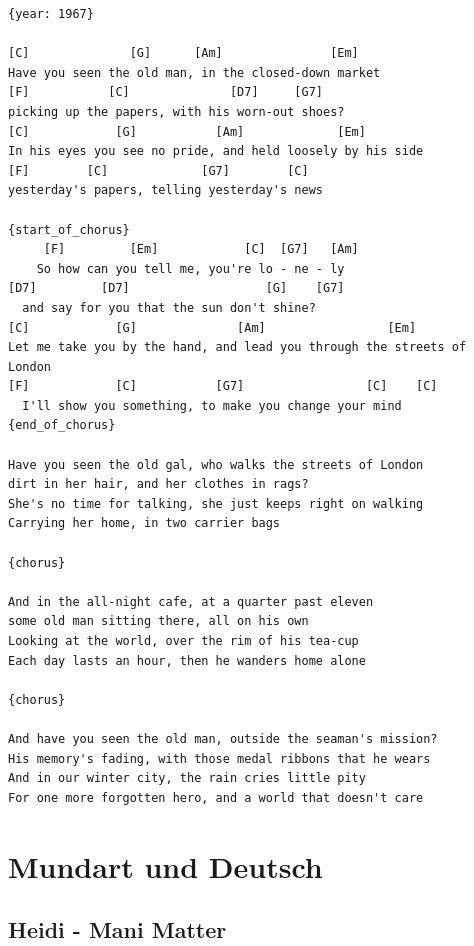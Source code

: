 \documentclass[]{book}
\let\stdsection\section
\renewcommand\section{\clearpage\stdsection}
\begin{document}
\begin{verbatim}
{year: 1967}

[C]              [G]      [Am]               [Em]
Have you seen the old man, in the closed-down market
[F]           [C]              [D7]     [G7]
picking up the papers, with his worn-out shoes?
[C]            [G]           [Am]             [Em]
In his eyes you see no pride, and held loosely by his side
[F]        [C]             [G7]        [C]
yesterday's papers, telling yesterday's news

{start_of_chorus}
     [F]         [Em]            [C]  [G7]   [Am]
    So how can you tell me, you're lo - ne - ly
[D7]         [D7]                   [G]    [G7]
  and say for you that the sun don't shine?
[C]            [G]              [Am]                 [Em]
Let me take you by the hand, and lead you through the streets of London
[F]            [C]           [G7]                 [C]    [C]
  I'll show you something, to make you change your mind
{end_of_chorus}

Have you seen the old gal, who walks the streets of London
dirt in her hair, and her clothes in rags?
She's no time for talking, she just keeps right on walking
Carrying her home, in two carrier bags

{chorus}

And in the all-night cafe, at a quarter past eleven
some old man sitting there, all on his own
Looking at the world, over the rim of his tea-cup
Each day lasts an hour, then he wanders home alone

{chorus}

And have you seen the old man, outside the seaman's mission?
His memory's fading, with those medal ribbons that he wears
And in our winter city, the rain cries little pity
For one more forgotten hero, and a world that doesn't care

\end{verbatim}

\hypertarget{mundart-und-deutsch}{%
\chapter{Mundart und Deutsch}\label{mundart-und-deutsch}}

\hypertarget{heidi---mani-matter}{%
\section{Heidi - Mani Matter}\label{heidi---mani-matter}}
\end{document}
